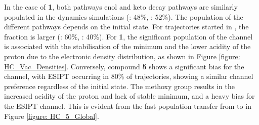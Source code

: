 In the case of \textbf{1}, both pathways enol and keto decay pathways are similarly populated in the dynamics simulations (\Kstar: 48\%, \Estar: 52\%). The population of the different pathways depends on the initial state. For trajectories started in \stwo{}, the fraction is larger (\Kstar: 60\%, \Estar: 40\%). For \textbf{1}, the significant population of the \Estar{} channel is associated with the stabilisation of the \Estar{} minimum and the lower acidity of the proton due to the electronic density distribution, as shown in Figure \ref{figure: HC_Vac_Densities}. Conversely, compound \textbf{5} shows a significant bias for the \Kstar{} channel, with ESIPT occurring in 80\% of trajectories, showing a similar channel preference regardless of the initial state. The methoxy group results in the increased acidity of the proton and lack of stable \Estar{} minimum, and a heavy bias for the ESIPT channel. This is evident from the fast population transfer from \Estar{} to \Kstar{} in Figure \ref{figure: HC_5_Global}.


